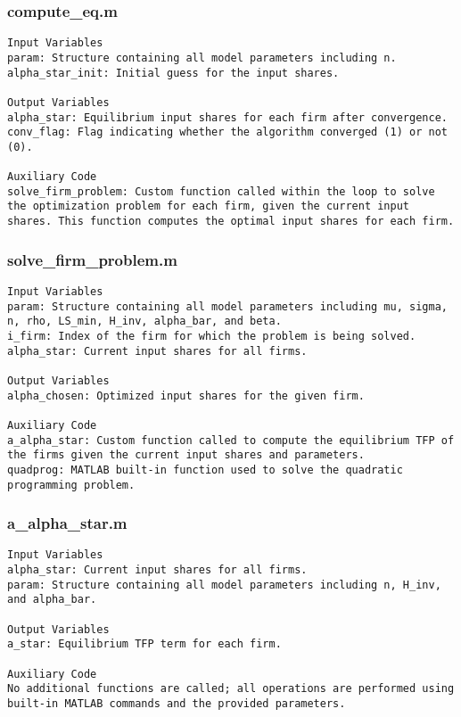 \documentclass[11pt]{article}
\theoremstyle{definition}
\newcommand{\codepath}{F:/12004835/replication_package_final/replication_package_final}
\begin{document}
	\subsubsection{compute\_eq.m}
	\begin{lstlisting}[style=Matlab]
Input Variables
param: Structure containing all model parameters including n.
alpha_star_init: Initial guess for the input shares.

Output Variables
alpha_star: Equilibrium input shares for each firm after convergence.
conv_flag: Flag indicating whether the algorithm converged (1) or not (0).

Auxiliary Code
solve_firm_problem: Custom function called within the loop to solve the optimization problem for each firm, given the current input shares. This function computes the optimal input shares for each firm.
	\end{lstlisting}
	
	
	
	\subsubsection{solve\_firm\_problem.m}
	\begin{lstlisting}[style=Matlab]
Input Variables
param: Structure containing all model parameters including mu, sigma, n, rho, LS_min, H_inv, alpha_bar, and beta.
i_firm: Index of the firm for which the problem is being solved.
alpha_star: Current input shares for all firms.

Output Variables
alpha_chosen: Optimized input shares for the given firm.

Auxiliary Code
a_alpha_star: Custom function called to compute the equilibrium TFP of the firms given the current input shares and parameters.
quadprog: MATLAB built-in function used to solve the quadratic programming problem.
	\end{lstlisting}
	
	
	
	\subsubsection{a\_alpha\_star.m}
	\begin{lstlisting}[style=Matlab]
Input Variables
alpha_star: Current input shares for all firms.
param: Structure containing all model parameters including n, H_inv, and alpha_bar.

Output Variables
a_star: Equilibrium TFP term for each firm.

Auxiliary Code
No additional functions are called; all operations are performed using built-in MATLAB commands and the provided parameters.
	\end{lstlisting}
	
	
\end{document}
